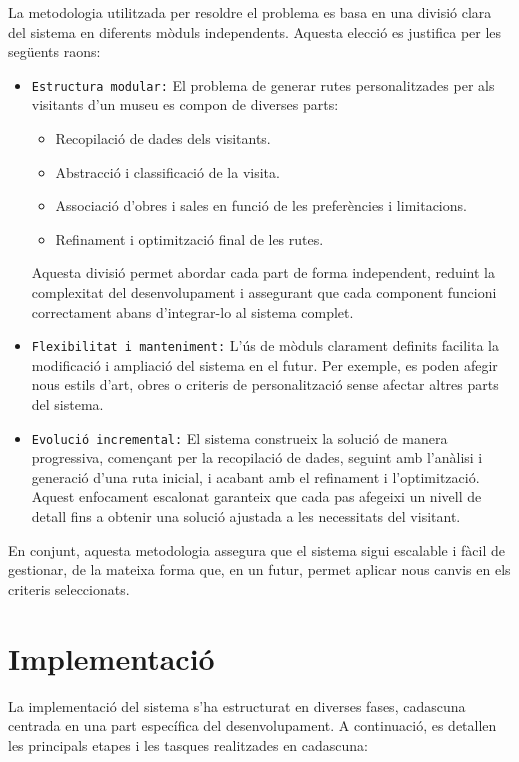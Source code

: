 \documentclass[a4paper]{article}
\begin{document}
	La metodologia utilitzada per resoldre el problema es basa en una divisió clara del sistema en diferents mòduls independents. Aquesta elecció es justifica per les següents raons:
	
	\begin{itemize}
		\item \texttt{Estructura modular:} El problema de generar rutes personalitzades per als visitants d’un museu es compon de diverses parts:
		\begin{itemize}
			\item Recopilació de dades dels visitants.
			\item Abstracció i classificació de la visita.
			\item Associació d’obres i sales en funció de les preferències i limitacions.
			\item Refinament i optimització final de les rutes.
		\end{itemize}
		Aquesta divisió permet abordar cada part de forma independent, reduint la complexitat del desenvolupament i assegurant que cada component funcioni correctament abans d’integrar-lo al sistema complet.
		
		\item \texttt{Flexibilitat i manteniment:} L'ús de mòduls clarament definits facilita la modificació i ampliació del sistema en el futur. Per exemple, es poden afegir nous estils d’art, obres o criteris de personalització sense afectar altres parts del sistema.
		
		\item \texttt{Evolució incremental:} El sistema construeix la solució de manera progressiva, començant per la recopilació de dades, seguint amb l’anàlisi i generació d’una ruta inicial, i acabant amb el refinament i l’optimització. Aquest enfocament escalonat garanteix que cada pas afegeixi un nivell de detall fins a obtenir una solució ajustada a les necessitats del visitant.
		
	\end{itemize}
	
	En conjunt, aquesta metodologia assegura que el sistema sigui escalable i fàcil de gestionar, de la mateixa forma que, en un futur, permet aplicar nous canvis en els criteris seleccionats.

	
	\newpage
	\section{Implementació}
	
	La implementació del sistema s'ha estructurat en diverses fases, cadascuna centrada en una part específica del desenvolupament. A continuació, es detallen les principals etapes i les tasques realitzades en cadascuna:
	
\end{document}
